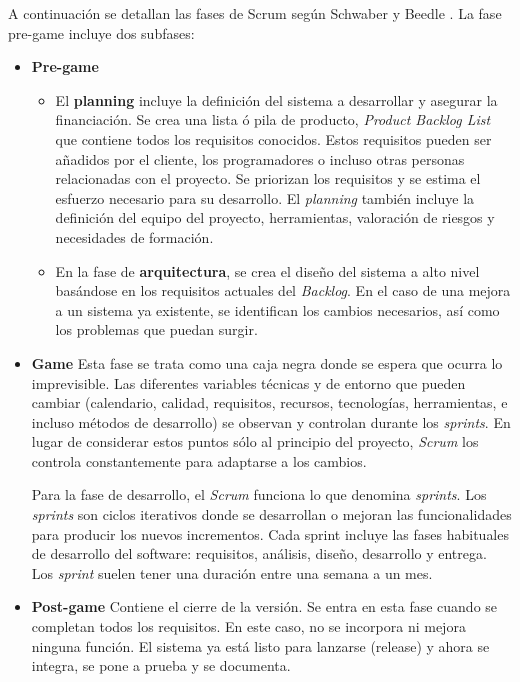 A continuación se detallan las fases de Scrum según Schwaber y Beedle \cite{Schwaber}. La fase pre-game incluye dos subfases:
\begin{itemize}

\item \textbf{Pre-game}
\begin{itemize}
\item El \textbf{\textbf{planning}} incluye la definición del sistema a desarrollar y asegurar la financiación. Se crea una lista ó pila de producto, \textit{Product Backlog List} que contiene todos los requisitos conocidos. Estos requisitos pueden ser añadidos por el cliente, los programadores o incluso otras personas relacionadas con el proyecto. Se priorizan los requisitos y se estima el esfuerzo necesario para su desarrollo. El \textit{planning} también incluye la definición del equipo del proyecto, herramientas, valoración de riesgos y necesidades de formación. 

\item En la fase de \textbf{arquitectura}, se crea el diseño del sistema a alto nivel basándose en los requisitos actuales del \textit{Backlog}. En el caso de una mejora a un sistema ya existente, se identifican los cambios necesarios, así como los problemas que puedan surgir.
\end{itemize}
\item \textbf{Game}
Esta fase se trata como una caja negra donde se espera  que ocurra lo imprevisible. Las diferentes variables técnicas y de entorno que pueden cambiar (calendario, calidad, requisitos, recursos, tecnologías, herramientas, e incluso métodos de desarrollo) se observan y controlan durante los \textit{sprints}. En lugar de considerar estos puntos sólo al principio del proyecto, \textit{Scrum} los controla constantemente para adaptarse a los cambios.

Para la fase de desarrollo, el \textit{Scrum} funciona lo que denomina \textit{sprints}. Los \textit{sprints} son ciclos iterativos donde se desarrollan o mejoran las funcionalidades para producir los nuevos incrementos. Cada sprint incluye las fases habituales de desarrollo del software: requisitos, análisis, diseño, desarrollo y entrega. Los \textit{sprint} suelen tener una duración entre una semana a un mes.

\item \textbf{Post-game}
Contiene el cierre de la versión. Se entra en esta fase cuando se completan todos los requisitos. En este caso, no se incorpora ni mejora ninguna función. El sistema ya está listo para lanzarse (release) y ahora se integra, se pone a prueba y se documenta.
\end{itemize}

